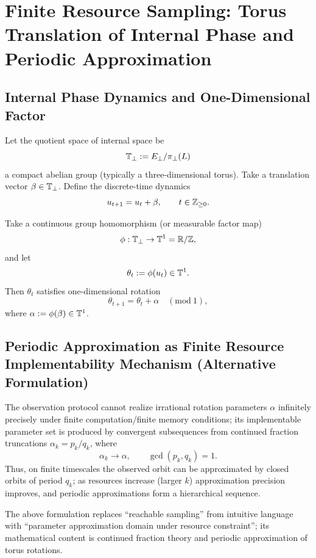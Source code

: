\section{Finite Resource Sampling: Torus Translation of Internal Phase and Periodic Approximation}

\subsection{Internal Phase Dynamics and One-Dimensional Factor}

\begin{definition}\label{def:internal-phase-translation}
Let the quotient space of internal space be
\[
\mathbb{T}_{\perp}:=E_{\perp}/\pi_{\perp}(L)
\]
a compact abelian group (typically a three-dimensional torus). Take a translation vector $\beta\in \mathbb{T}_{\perp}$. Define the discrete-time dynamics
\[
u_{t+1}=u_t+\beta,\qquad t\in\mathbb{Z}_{\ge 0}.
\]
\end{definition}

\begin{definition}\label{def:one-dimensional-factor}
Take a continuous group homomorphism (or measurable factor map)
\[
\phi:\mathbb{T}_{\perp}\to \mathbb{T}^1=\mathbb{R}/\mathbb{Z},
\]
and let
\[
\theta_t:=\phi(u_t)\in\mathbb{T}^1.
\]
Then $\theta_t$ satisfies one-dimensional rotation
\[
\theta_{t+1}=\theta_t+\alpha\quad (\mathrm{mod}\ 1),
\]
where $\alpha:=\phi(\beta)\in \mathbb{T}^1$.
\end{definition}

\subsection{Periodic Approximation as Finite Resource Implementability Mechanism (Alternative Formulation)}

\begin{assumption}\label{assump:finite-resource-cf}
The observation protocol cannot realize irrational rotation parameters $\alpha$ infinitely precisely under finite computation/finite memory conditions; its implementable parameter set is produced by convergent subsequences from continued fraction truncations $\alpha_k=p_k/q_k$, where
\[
\alpha_k\to \alpha,\qquad \gcd(p_k,q_k)=1.
\]
Thus, on finite timescales the observed orbit can be approximated by closed orbits of period $q_k$; as resources increase (larger $k$) approximation precision improves, and periodic approximations form a hierarchical sequence.
\end{assumption}

\begin{remark}
The above formulation replaces ``reachable sampling'' from intuitive language with ``parameter approximation domain under resource constraint''; its mathematical content is continued fraction theory and periodic approximation of torus rotations.
\end{remark}
